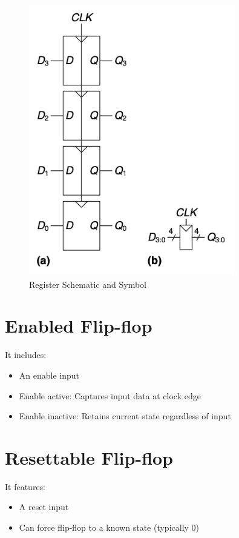 \documentclass[12pt]{report}
\begin{document}
\begin{figure}[H]
    \centering
    \includegraphics[width=0.8\textwidth]{Register_schematic_and_symbol.png}
    \caption{Register Schematic and Symbol}
\end{figure}

\section{Enabled Flip-flop}
 It includes:
\begin{itemize}
    \item An enable input
    \item Enable active: Captures input data at clock edge
    \item Enable inactive: Retains current state regardless of input
\end{itemize}

\section{Resettable Flip-flop}
 It features:
\begin{itemize}
    \item A reset input
    \item Can force flip-flop to a known state (typically 0)
\end{itemize}
\end{document}
